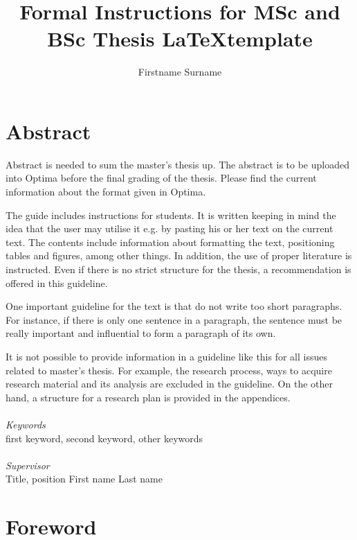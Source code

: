 \documentclass[a4paper,12pt]{article}
\author{Firstname Surname}
\title{Formal Instructions for MSc and BSc Thesis \LaTeX \space template}
\institute{University Of Oulu}
\begin{document}
\maketitle

\setcounter{page}{2}

\section*{Abstract}
Abstract is needed to sum the master’s thesis up. The abstract is to be uploaded into Optima before the final grading of the thesis. Please find the current information about the format given in Optima.

The guide includes instructions for students. It is written keeping in mind the idea that the user may utilise it e.g. by pasting his or her text on the current text. The contents include information about formatting the text, positioning tables and figures, among other things. In addition, the use of proper literature is instructed. Even if there is no strict structure for the thesis, a recommendation is offered in this guideline.

One important guideline for the text is that do not write too short paragraphs. For instance, if there is only one sentence in a paragraph, the sentence must be really important and influential to form a paragraph of its own.

It is not possible to provide information in a guideline like this for all issues related to master’s thesis. For example, the research process, ways to acquire research material and its analysis are excluded in the guideline. On the other hand, a structure for a research plan is provided in the appendices.
\\
\\
{\sffamily\itshape Keywords}\\
first keyword, second keyword, other keywords
\\
\\
{\sffamily\itshape Supervisor}\\
Title, position First name Last name

\newpage
\section*{Foreword}
\end{document}
